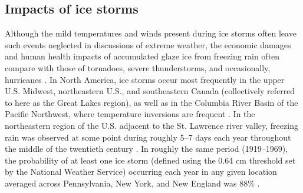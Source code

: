 \documentclass[twocol]{ametsoc}
\begin{document}
\subsection{Impacts of ice storms}
Although the mild temperatures and winds present during ice storms often leave such events neglected in discussions of extreme weather, the economic damages and human health impacts of accumulated glaze ice from freezing rain often compare with those of tornadoes, severe thunderstorms, and occasionally, hurricanes \citep{lott2006tracking}. In North America, ice storms occur most frequently in the upper U.S. Midwest, northeastern U.S., and southeastern Canada (collectively referred to here as the Great Lakes region), as well as in the Columbia River Basin of the Pacific Northwest, where temperature inversions are frequent \citep{changnon2003temporal, bernstein2000regional}. In the northeastern region of the U.S. adjacent to the St. Lawrence river valley, freezing rain was observed at some point during roughly 5--7 days each year throughout the middle of the twentieth century \citep{changnon2003temporal}. In roughly the same period (1919--1969), the probability of at least one ice storm (defined using the 0.64 cm threshold set by the National Weather Service) occurring each year in any given location averaged across Pennsylvania, New York, and New England was 88\% \citep{tattelman1973estimated}. 
\end{document}

